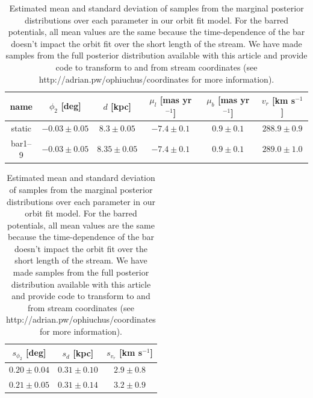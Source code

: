 \documentclass[letterpaper,12pt,preprint]{aastex}
\begin{document}
\begin{table}[ht]
\footnotesize
\begin{center}
	\begin{tabular}{cccccc}
	\toprule
	name & $\phi_2$ [deg] & $d$ [kpc] & $\mu_l$ [mas yr$^{-1}$] & $\mu_b$ [mas yr$^{-1}$] & $v_r$ [km s$^{-1}$]\\\midrule
	static & $-0.03\pm0.05$ & $8.3\pm0.05$ & $-7.4\pm0.1$ & $0.9\pm0.1$ & $288.9\pm0.9$\\
	bar1--9 & $-0.03\pm0.05$ & $8.35\pm0.05$ & $-7.4\pm0.1$ & $0.9\pm0.1$ & $289.0\pm1.0$\\
	\bottomrule
	\end{tabular}
	
	\begin{tabular}{ccc}
	\toprule
	$s_{\phi_2}$ [deg] & $s_{d}$ [kpc] & $s_{v_r}$ [km s$^{-1}$]\\\midrule
	$0.20\pm0.04$ & $0.31\pm0.10$ & $2.9\pm0.8$\\
	$0.21\pm0.05$ & $0.31\pm0.14$ & $3.2\pm0.9$\\
	\bottomrule
	\end{tabular}
	\caption{Estimated mean and standard deviation of samples from the marginal posterior distributions over each parameter in our orbit fit model. For the barred potentials, all mean values are the same because the time-dependence of the bar doesn't impact the orbit fit over the short length of the stream. We have made samples from the full posterior distribution available with this article and provide code to transform to and from stream coordinates (see http://adrian.pw/ophiuchus/coordinates for more information).\label{tbl:param-means} }
\end{center}
\end{table}
\end{document}
